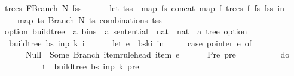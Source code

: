 \begin{isabellebody}
{\isacharbar}{\kern0pt}\ {\isachardoublequoteopen}trees\ {\isacharparenleft}{\kern0pt}FBranch\ N\ fss{\isacharparenright}{\kern0pt}\ {\isacharequal}{\kern0pt}\ {\isacharparenleft}{\kern0pt}\isanewline
\ \ \ \ let\ tss\ {\isacharequal}{\kern0pt}\ {\isacharparenleft}{\kern0pt}map\ {\isacharparenleft}{\kern0pt}{\isasymlambda}fs{\isachardot}{\kern0pt}\ concat\ {\isacharparenleft}{\kern0pt}map\ {\isacharparenleft}{\kern0pt}{\isasymlambda}f{\isachardot}{\kern0pt}\ trees\ f{\isacharparenright}{\kern0pt}\ fs{\isacharparenright}{\kern0pt}{\isacharparenright}{\kern0pt}\ fss{\isacharparenright}{\kern0pt}\ in\isanewline
\ \ \ \ map\ {\isacharparenleft}{\kern0pt}{\isasymlambda}ts{\isachardot}{\kern0pt}\ Branch\ N\ ts{\isacharparenright}{\kern0pt}\ {\isacharparenleft}{\kern0pt}combinations\ tss{\isacharparenright}{\kern0pt}\isanewline
\ \ {\isacharparenright}{\kern0pt}{\isachardoublequoteclose}%
\isadelimdocument
%
\endisadelimdocument
%
\isatagdocument
%
\isamarkuptrue%
%
\endisatagdocument
{\isafolddocument}%
%
\isadelimdocument
%
\endisadelimdocument
{}\isamarkupfalse%
\ {\isacharparenleft}{\kern0pt}option{\isacharparenright}{\kern0pt}\ build{\isacharunderscore}{\kern0pt}tree{\isacharprime}{\kern0pt}\ {\isacharcolon}{\kern0pt}{\isacharcolon}{\kern0pt}\ {\isachardoublequoteopen}{\isacharprime}{\kern0pt}a\ bins\ {\isasymRightarrow}\ {\isacharprime}{\kern0pt}a\ sentential\ {\isasymRightarrow}\ nat\ {\isasymRightarrow}\ nat\ {\isasymRightarrow}\ {\isacharprime}{\kern0pt}a\ tree\ option{\isachardoublequoteclose}\ \isanewline
\ \ {\isachardoublequoteopen}build{\isacharunderscore}{\kern0pt}tree{\isacharprime}{\kern0pt}\ bs\ inp\ k\ i\ {\isacharequal}{\kern0pt}\ {\isacharparenleft}{\kern0pt}\isanewline
\ \ \ \ let\ e\ {\isacharequal}{\kern0pt}\ bs{\isacharbang}{\kern0pt}k{\isacharbang}{\kern0pt}i\ in\ {\isacharparenleft}{\kern0pt}\isanewline
\ \ \ \ case\ pointer\ e\ of\isanewline
\ \ \ \ \ \ Null\ {\isasymRightarrow}\ Some\ {\isacharparenleft}{\kern0pt}Branch\ {\isacharparenleft}{\kern0pt}item{\isacharunderscore}{\kern0pt}rule{\isacharunderscore}{\kern0pt}head\ {\isacharparenleft}{\kern0pt}item\ e{\isacharparenright}{\kern0pt}{\isacharparenright}{\kern0pt}\ {\isacharbrackleft}{\kern0pt}{\isacharbrackright}{\kern0pt}{\isacharparenright}{\kern0pt}\isanewline
\ \ \ \ {\isacharbar}{\kern0pt}\ Pre\ pre\ {\isasymRightarrow}\ {\isacharparenleft}{\kern0pt}\isanewline
\ \ \ \ \ \ \ \ do\ {\isacharbraceleft}{\kern0pt}\isanewline
\ \ \ \ \ \ \ \ \ \ t\ {\isasymleftarrow}\ build{\isacharunderscore}{\kern0pt}tree{\isacharprime}{\kern0pt}\ bs\ inp\ {\isacharparenleft}{\kern0pt}k{\isacharminus}{\kern0pt}{}{\isacharparenright}{\kern0pt}\ pre{\isacharsemicolon}{\kern0pt}\isanewline

\end{isabellebody}
